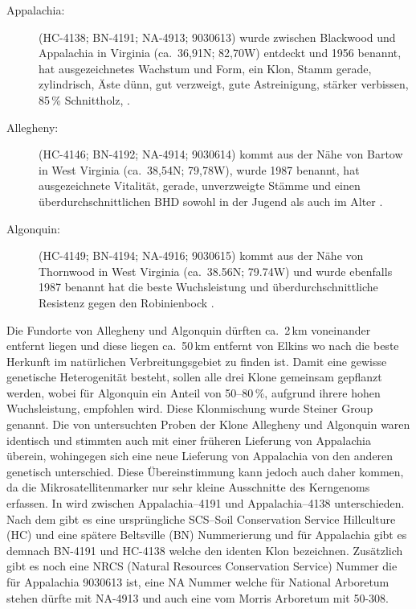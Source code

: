 \documentclass[twocolumn]{scrartcl}
\begin{document}
\begin{description}
  \item[Appalachia:] (HC-4138; BN-4191; NA-4913; 9030613) wurde zwischen
Blackwood und Appalachia in Virginia (ca.~36,91N; 82,70W) entdeckt und 1956
benannt, hat ausgezeichnetes Wachstum und Form, ein Klon, Stamm gerade,
zylindrisch, Äste dünn, gut verzweigt, gute Astreinigung, stärker verbissen,
85\,\% Schnittholz, \citep{steinergroup1987robinie,zsombor1980robinie,kapusi1995robinie}.
  \item[Allegheny:]  (HC-4146; BN-4192; NA-4914; 9030614) kommt aus der Nähe von
Bartow in West Virginia (ca.~38,54N; 79,78W), wurde 1987 benannt, hat
ausgezeichnete Vitalität, gerade, unverzweigte Stämme und einen
überdurchschnittlichen BHD sowohl in der Jugend als auch im Alter \citep{steinergroup1987robinie}.
  \item[Algonquin:] (HC-4149; BN-4194; NA-4916; 9030615) kommt aus der Nähe von
Thornwood in West Virginia (ca.~38.56N; 79.74W) und wurde ebenfalls 1987 benannt
hat die beste Wuchsleistung und überdurchschnittliche Resistenz gegen den
Robinienbock \citep{steinergroup1987robinie}.
\end{description}

Die Fundorte von Allegheny und Algonquin dürften ca.\ 2\,km
voneinander entfernt liegen und diese liegen ca.\ 50\,km entfernt von Elkins wo
nach \citet{hopp1941robinie} die beste Herkunft im natürlichen Verbreitungsgebiet
zu finden ist.  Damit eine gewisse genetische Heterogenität besteht, sollen alle
drei Klone gemeinsam gepflanzt werden, wobei für Algonquin ein Anteil von
50--80\,\%, aufgrund ihrere hohen Wuchsleistung, empfohlen wird. Diese
Klonmischung wurde Steiner Group genannt. Die von \citet{liesebach2012robinie}
untersuchten Proben der Klone Allegheny und Algonquin waren identisch und
stimmten auch mit einer früheren Lieferung von Appalachia überein, wohingegen
sich eine neue Lieferung von Appalachia von den anderen genetisch unterschied.
Diese Übereinstimmung kann jedoch auch daher kommen, da die
Mikrosatellitenmarker nur sehr kleine Ausschnitte des Kerngenoms erfassen. In
\citet{liesebach2021robinie} wird zwischen Appalachia--4191 und Appalachia--4138
unterschieden. Nach dem \citet{steinergroup1987robinie} gibt es eine
ursprüngliche SCS--Soil Conservation Service Hillculture (HC) und eine spätere
Beltsville (BN) Nummerierung und für Appalachia gibt es demnach BN-4191 und
HC-4138 welche den identen Klon bezeichnen. Zusätzlich gibt es noch eine NRCS
(Natural Resources Conservation Service) Nummer die für Appalachia 9030613 ist,
eine NA Nummer welche für National Arboretum stehen dürfte mit NA-4913 und auch
eine vom Morris Arboretum mit 50-308.
\end{document}
